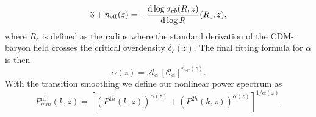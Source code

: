\documentclass[../main.tex]{subfiles}
\begin{document}
\begin{equation}
    3+n_\mathrm{eff}(z) = - \frac{\mathrm{d} \log \sigma_{cb}(R,z)}{\mathrm{d} \log R}(R_c,z),
\end{equation}
where $R_c$ is defined as the radius where the standard derivation of the CDM-baryon field crosses the critical overdensity $\delta_c(z)$. The final fitting formula for $\alpha$ is then \begin{equation}
    \alpha(z) = \mathcal{A}_\alpha\,\left[\mathcal{C}_\alpha\right]^{n_\mathrm{eff}(z)}.
\end{equation}
With the transition smoothing we define our nonlinear power spectrum as \begin{equation}
    P^{\mathrm{nl}}_{mm}(k,z) = \left[\left(P^{1h}(k,z)\right)^{\alpha(z)} + \left(P^{2h}(k,z)\right)^{\alpha(z)} \right]^{1/\alpha(z)} .
\end{equation}
\end{document}
